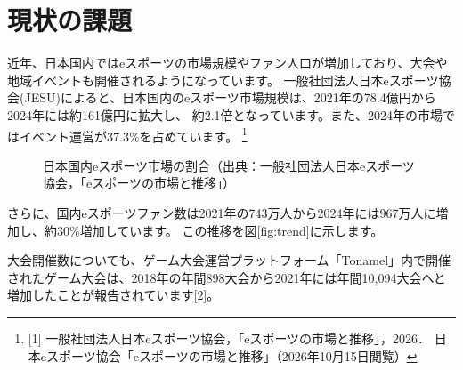 \section{現状の課題}

近年、日本国内ではeスポーツの市場規模やファン人口が増加しており、大会や地域イベントも開催されるようになっています。
一般社団法人日本eスポーツ協会(JESU)によると、日本国内のeスポーツ市場規模は、2021年の78.4億円から2024年には約161億円に拡大し、
約2.1倍となっています。また、2024年の市場ではイベント運営が37.3\%を占めています。\cite{jeSU2026} 
\footnote{[1] 一般社団法人日本eスポーツ協会，「eスポーツの市場と推移」，2026． 
 日本eスポーツ協会「eスポーツの市場と推移」（2026年10月15日閲覧）}

\begin{figure}[H]
  \centering
  \makeatletter
  \def\pgfpie@numbertext#1{%
    \pgfpie@ifhidenumber{}{%
      \ifdim #1pt<1pt
      \else
        \pgfpie@beforenumber#1\pgfpie@afternumber
      \fi
    }%
  }
  \makeatother
  \caption{日本国内eスポーツ市場の割合（出典：一般社団法人日本eスポーツ協会，「eスポーツの市場と推移」）}
  \label{fig:revenue}
\end{figure}


さらに、国内eスポーツファン数は2021年の743万人から2024年には967万人に増加し、約30\%増加しています。
この推移を図\ref{fig:trend}に示します。

大会開催数についても、ゲーム大会運営プラットフォーム「Tonamel」内で開催されたゲーム大会は、2018年の年間898大会から2021年には年間10,094大会へと増加したことが報告されています[2]。



% 

